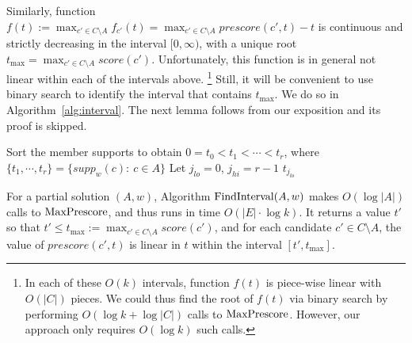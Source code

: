 Similarly, function $f(t):= \max_{c'\in C\setminus A} f_{c'}(t) = \max_{c'\in C\setminus A} prescore(c',t) -t$ is continuous and strictly decreasing in the interval $[0,\infty)$, with a unique root $t_{\max}=\max_{c'\in C\setminus A} score(c')$. Unfortunately, this function is in general not linear within each of the intervals above.%
%
\footnote{In each of these $O(k)$ intervals, function $f(t)$ is piece-wise linear with $O(|C|)$ pieces. We could thus find the root of $f(t)$ via binary search by performing $O(\log k + \log |C|)$ calls to $\operatorname{MaxPrescore}$. However, our approach only requires $O(\log k)$ such calls.} %
%
Still, it will be convenient to use binary search to identify the interval that contains $t_{\max}$. We do so in Algorithm~\ref{alg:interval}. The next lemma follows from our exposition and its proof is skipped.

\begin{algorithm}[htb]\label{alg:interval}
\SetAlgoLined
{}
Sort the member supports to obtain $0=t_0<t_1<\cdots <t_r$, where $\{t_1, \cdots, t_r\}=\{supp_w(c): \ c\in A\}$\;
Let $j_{lo}=0$, $j_{hi}=r-1$\;
\Return $t_{j_{lo}}$\;

 \caption{$\interval(A,w)$}
\end{algorithm}

\begin{lemma}
For a partial solution $(A,w)$, Algorithm $\interval(A,w)$ makes $O(\log |A|)$ calls to $\operatorname{MaxPrescore}$, and thus runs in time $O(|E|\cdot \log k)$. It returns a value $t'$ so that $t'\leq t_{\max}:=\max_{c'\in C\setminus A} score(c')$, and for each candidate $c'\in C\setminus A$, the value of $prescore(c',t)$ is linear in $t$ within the interval $[t',t_{\max}]$.
\end{lemma}

